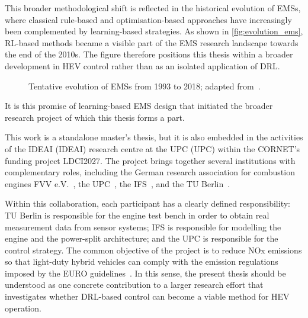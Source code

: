 This broader methodological shift is reflected in the historical evolution of \acp{EMS}, where classical rule-based and optimisation-based approaches have increasingly been complemented by learning-based strategies. As shown in \autoref{fig:evolution_ems}, \ac{RL}-based methods became a visible part of the \ac{EMS} research landscape towards the end of the 2010s. The figure therefore positions this thesis within a broader development in \ac{HEV} control rather than as an isolated application of \ac{DRL}.

\begin{figure}[htbp]
  \centering
  
  \caption[Evolution of EMSs]{Tentative evolution of \acp{EMS} from 1993 to 2018; adapted from~\cite{biswas_energy_2019}.}
  \label{fig:evolution_ems}
\end{figure}

It is this promise of learning-based \ac{EMS} design that initiated the broader research project of which this thesis forms a part.

This work is a standalone master's thesis, but it is also embedded in the activities of the IDEAI (\ac{IDEAI}) research centre at the UPC (\ac{UPC}) within the CORNET's funding project \cite{cornet_-_collective_research_networking_cornet_nodate} \ac{LDCI2027}. The project brings together several institutions with complementary roles, including the German research association for combustion engines \ac{FVV} e.V.~\cite{fvv_e_v_-_forschungsvereinigung_verbrennungskraftmaschinen_fvv_nodate}, the UPC~\cite{universitat_politecnica_de_catalunya_upc_nodate}, the \ac{IFS}~\cite{institut_fur_fahrzeugtechnik_stuttgart_institut_2026}, and the \ac{TU} Berlin~\cite{technische_universitat_berlin_technische_2026}.

Within this collaboration, each participant has a clearly defined responsibility: TU Berlin is responsible for the engine test bench in order to obtain real measurement data from sensor systems; IFS is responsible for modelling the engine and the power-split architecture; and the UPC is responsible for the control strategy. The common objective of the project is to reduce \ac{NOx} emissions so that light-duty hybrid vehicles can comply with the emission regulations imposed by the EURO guidelines~\cite{european_union_regulation_2024, european_union_regulation_2007}. In this sense, the present thesis should be understood as one concrete contribution to a larger research effort that investigates whether DRL-based control can become a viable method for HEV operation.

